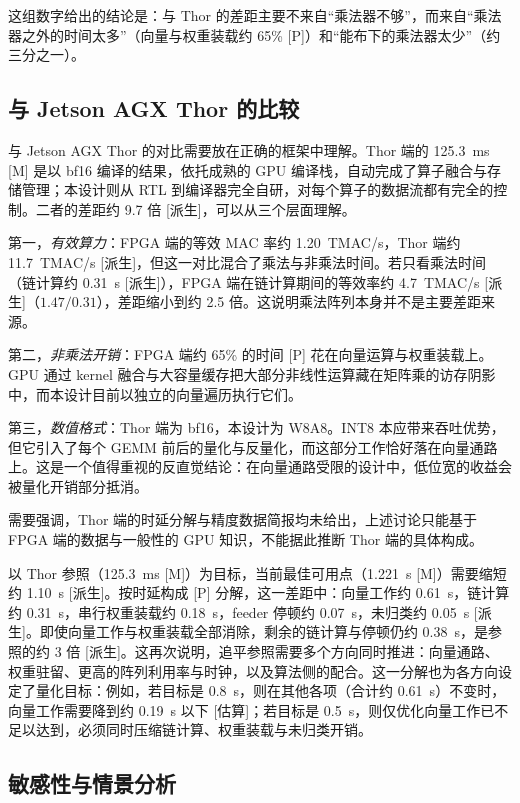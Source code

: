 \documentclass[a4paper,10.5pt]{ctexart}
\newcommand{\tM}{\textsf{[M]}}              %
\newcommand{\tP}{\textsf{[P]}}              %
\newcommand{\tD}{\textsf{[派生]}}           %
\newcommand{\tE}{\textsf{[估算]}}           %
\begin{document}
这组数字给出的结论是：与 Thor 的差距主要不来自“乘法器不够”，而来自“乘法器之外的时间太多”（向量与权重装载约 65\% \tP）和“能布下的乘法器太少”（约三分之一）。

\subsection{与 Jetson AGX Thor 的比较}\label{sec:thor}

与 Jetson AGX Thor 的对比需要放在正确的框架中理解。Thor 端的 125.3~ms \tM{} 是以 bf16 编译的结果，依托成熟的 GPU 编译栈，自动完成了算子融合与存储管理；本设计则从 RTL 到编译器完全自研，对每个算子的数据流都有完全的控制。二者的差距约 9.7 倍 \tD，可以从三个层面理解。

第一，\emph{有效算力}：FPGA 端的等效 MAC 率约 1.20~TMAC/s，Thor 端约 11.7~TMAC/s \tD，但这一对比混合了乘法与非乘法时间。若只看乘法时间（链计算约 0.31~s \tD），FPGA 端在链计算期间的等效率约 4.7~TMAC/s \tD（$1.47/0.31$），差距缩小到约 2.5 倍。这说明乘法阵列本身并不是主要差距来源。

第二，\emph{非乘法开销}：FPGA 端约 65\% 的时间 \tP{} 花在向量运算与权重装载上。GPU 通过 kernel 融合与大容量缓存把大部分非线性运算藏在矩阵乘的访存阴影中，而本设计目前以独立的向量遍历执行它们。

第三，\emph{数值格式}：Thor 端为 bf16，本设计为 W8A8。INT8 本应带来吞吐优势，但它引入了每个 GEMM 前后的量化与反量化，而这部分工作恰好落在向量通路上。这是一个值得重视的反直觉结论：在向量通路受限的设计中，低位宽的收益会被量化开销部分抵消。

需要强调，Thor 端的时延分解与精度数据简报均未给出，上述讨论只能基于 FPGA 端的数据与一般性的 GPU 知识，不能据此推断 Thor 端的具体构成。

以 Thor 参照（125.3~ms \tM）为目标，当前最佳可用点（1.221~s \tM）需要缩短约 1.10~s \tD。按时延构成 \tP{} 分解，这一差距中：向量工作约 0.61~s，链计算约 0.31~s，串行权重装载约 0.18~s，feeder 停顿约 0.07~s，未归类约 0.05~s \tD。即使向量工作与权重装载全部消除，剩余的链计算与停顿仍约 0.38~s，是参照的约 3 倍 \tD。这再次说明，追平参照需要多个方向同时推进：向量通路、权重驻留、更高的阵列利用率与时钟，以及算法侧的配合。这一分解也为各方向设定了量化目标：例如，若目标是 0.8~s，则在其他各项（合计约 0.61~s）不变时，向量工作需要降到约 0.19~s 以下 \tE；若目标是 0.5~s，则仅优化向量工作已不足以达到，必须同时压缩链计算、权重装载与未归类开销。

\subsection{敏感性与情景分析}
\end{document}
